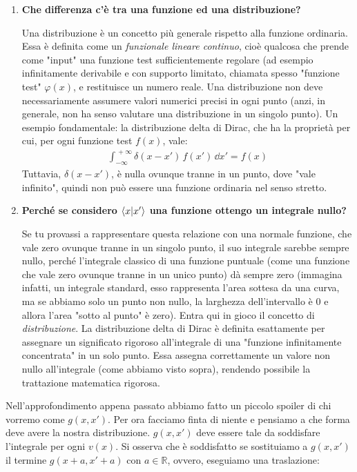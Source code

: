\begin{myapprf}
\begin{enumerate}[label=\arabic*)]
	\item \textbf{Che differenza c'è tra una funzione ed una distribuzione?}
	
		Una distribuzione è un concetto più generale rispetto alla funzione ordinaria. Essa è definita come un \textit{funzionale lineare continuo}, cioè qualcosa che prende come "input" una funzione test sufficientemente regolare (ad esempio infinitamente derivabile e con supporto limitato, chiamata spesso "funzione test" $\varphi(x)$, e restituisce un numero reale. Una distribuzione non deve necessariamente assumere valori numerici precisi in ogni punto (anzi, in generale, non ha senso valutare una distribuzione in un singolo punto). Un esempio fondamentale: la distribuzione delta di Dirac, che ha la proprietà per cui, per ogni funzione test $f(x)$, vale:
	\begin{align*}
		\int_{-\infty}^{\, +\infty} \delta(x-x') \, f(x') \, \dd x' = f(x)
	\end{align*}
		Tuttavia, $\delta(x-x')$, è nulla ovunque tranne in un punto, dove "vale infinito", quindi non può essere una funzione ordinaria nel senso stretto.
	\item \textbf{Perché se considero $\braket{x}{x'}$ una funzione ottengo un integrale nullo?}
	
		Se tu provassi a rappresentare questa relazione con una normale funzione, che vale zero ovunque tranne in un singolo punto, il suo integrale sarebbe sempre nullo, perché l’integrale classico di una funzione puntuale (come una funzione che vale zero ovunque tranne in un unico punto) dà sempre zero (immagina infatti, un integrale standard, esso rappresenta l'area sottesa da una curva, ma se abbiamo solo un punto non nullo, la larghezza dell'intervallo è 0 e allora l'area "sotto al punto" è zero). Entra qui in gioco il concetto di \textit{distribuzione}. La distribuzione delta di Dirac è definita esattamente per assegnare un significato rigoroso all’integrale di una "funzione infinitamente concentrata" in un solo punto. Essa assegna correttamente un valore non nullo all’integrale (come abbiamo visto sopra), rendendo possibile la trattazione matematica rigorosa.
		
\end{enumerate}
\end{myapprf}

	Nell'approfondimento appena passato abbiamo fatto un piccolo spoiler di chi vorremo come $g(x, x')$. Per ora facciamo finta di niente e pensiamo a che forma deve avere la nostra distribuzione. $g(x, x')$ deve essere tale da soddisfare l'integrale per ogni $v(x)$. Si osserva che è soddisfatto se sostituiamo a $g(x, x')$ il termine $g(x+a, x' +a)$ con $a \in \mathbb{R}$, ovvero, eseguiamo una traslazione:
	
